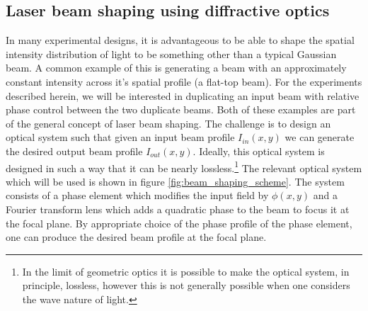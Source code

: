 \subsection{Laser beam shaping using diffractive optics}
\label{theory_ts}
In many experimental designs, it is advantageous to be able to shape the spatial intensity distribution of light to be something other than a typical Gaussian beam.  A common example of this is generating a beam with an approximately constant intensity across it's spatial profile (a flat-top beam).  For the experiments described herein, we will be interested in duplicating an input beam with relative phase control between the two duplicate beams.  Both of these examples are part of the general concept of laser beam shaping.  The challenge is to design an optical system such that given an input beam profile $I_{in}(x,y)$ we can generate the desired output beam profile $I_{out}(x,y)$. Ideally, this optical system is designed in such a way that it can be nearly lossless.\footnote{In the limit of geometric optics it is possible to make the optical system, in principle, lossless, however this is not generally possible when one considers the wave nature of light.}  The relevant optical system which will be used is shown in figure \ref{fig:beam_shaping_scheme}.  The system consists of a phase element which modifies the input field by $\phi(x,y)$ and a Fourier transform lens which adds a quadratic phase to the beam to focus it at the focal plane.  By appropriate choice of the phase profile of the phase element, one can produce the desired beam profile at the focal plane.


